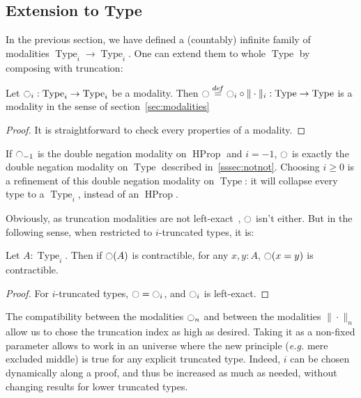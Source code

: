 \documentclass[notfinal]{jfrarticle}
\DeclareMathOperator{\Type}{Type}
\DeclareMathOperator{\HProp}{HProp}
\newcommand \defeq {\overset{de\hspace{-0.2ex}f}{=}}
\newcommand{\modal}{\ensuremath{\ocircle}}
\begin{document}


\subsection{Extension to Type}
\label{ssec:extension-type}

In the previous section, we have defined a (countably) infinite family of
modalities $\Type_i \to \Type_i$. One can extend them to whole
$\Type$ by composing with truncation:

\begin{lem}\label{lem:type}
  Let $\modal_i:\Type_i \to \Type_i$ be a modality. Then $\modal
  \defeq \modal_i
  \circ \|\cdot\|_i : \Type \to \Type$ is a modality in the sense
  of section~\ref{sec:modalities}
\end{lem}
\begin{proof}
  It is straightforward to check every properties of a modality.
\end{proof}
If $\modal_{-1}$ is the double negation modality on $\HProp$ and
$i=-1$, $\modal$ is exactly the double negation modality on $\Type$
described in~\ref{sssec:notnot}.
Choosing $i\geqslant 0$ is a refinement of this double negation
modality on $\Type$: it will collapse every type to a $\Type_i$,
instead of an $\HProp$.

Obviously, as truncation modalities are not left-exact~\cite[Exercise
7.11]{hottbook}, $\modal$ isn't either. But in the following sense, when
restricted to $i$-truncated types, it is:
\begin{lem}
  Let $A:\Type_i$. Then if $\modal(A)$ is contractible, for any $x,y:A$,
  $\modal(x=y)$ is contractible.
\end{lem}
\begin{proof}
  For $i$-truncated types, $\modal = \modal_i$, and $\modal_i$ is left-exact.
\end{proof}

The compatibility between the modalities $\modal_n$ and between the
modalities $\|\cdot \|_n$ allow us to chose the truncation index as
high as desired.
Taking it as a non-fixed parameter allows to work in an
universe where the new principle ({\em e.g.} mere excluded middle) is
true for any explicit truncated type. Indeed, $i$ can be chosen
dynamically along a proof, and thus be increased as much as needed,
without changing results for lower truncated types.
\end{document}
